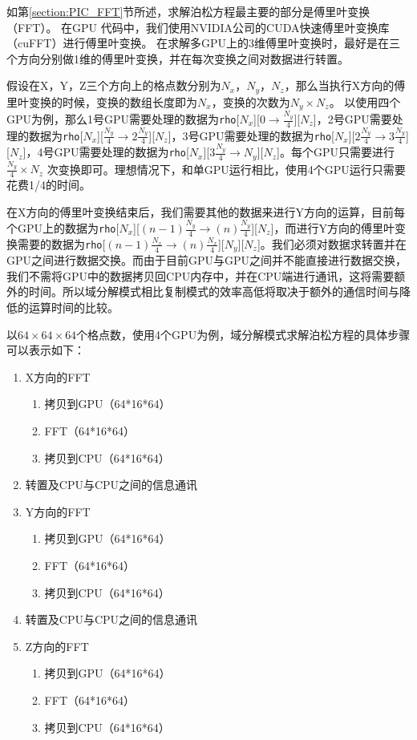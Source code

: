 如第\ref{section:PIC_FFT}节所述，求解泊松方程最主要的部分是傅里叶变换（FFT）。
在GPU 代码中，我们使用NVIDIA公司的CUDA快速傅里叶变换库（cuFFT）\cite{nvidia2010cufft}进行傅里叶变换。
在求解多GPU上的3维傅里叶变换时，最好是在三个方向分别做1维的傅里叶变换，并在每次变换之间对数据进行转置。

假设在X，Y，Z三个方向上的格点数分别为$N_x$，$N_y$，$N_z$，那么当执行X方向的傅里叶变换的时候，变换的数组长度即为$N_x$，变换的次数为$N_y \times N_z$。 以使用四个GPU为例，那么1号GPU需要处理的数据为\verb'rho'[$N_x$][$0 \rightarrow \frac{N_y}{4}$][$N_z$]，2号GPU需要处理的数据为\verb'rho'[$N_x$][$\frac{N_y}{4} \rightarrow 2\frac{N_y}{4}$][$N_z$]，3号GPU需要处理的数据为\verb'rho'[$N_x$][$2\frac{N_y}{4}\rightarrow 3\frac{N_y}{4}$][$N_z$]，4号GPU需要处理的数据为\verb'rho'[$N_x$][$3\frac{N_y}{4}\rightarrow N_y$][$N_z$]。每个GPU只需要进行$\frac{N_y}{4} \times N_z$ 次变换即可。理想情况下，和单GPU运行相比，使用4个GPU运行只需要花费1/4的时间。

在X方向的傅里叶变换结束后，我们需要其他的数据来进行Y方向的运算，目前每个GPU上的数据为\verb'rho'[$N_x$][$(n-1)\frac{N_y}{4}\rightarrow (n)\frac{N_y}{4}$][$N_z$]，而进行Y方向的傅里叶变换需要的数据为\verb'rho'[$(n-1)\frac{N_x}{4}\rightarrow (n)\frac{N_x}{4}$][$N_y$][$N_z$]。我们必须对数据求转置并在GPU之间进行数据交换。而由于目前GPU与GPU之间并不能直接进行数据交换，我们不需将GPU中的数据拷贝回CPU内存中，并在CPU端进行通讯，这将需要额外的时间。所以域分解模式相比复制模式的效率高低将取决于额外的通信时间与降低的运算时间的比较。

以$64 \times 64 \times 64$个格点数，使用4个GPU为例，域分解模式求解泊松方程的具体步骤可以表示如下：
\begin{enumerate}
  \item X方向的FFT
  \begin{enumerate}
    \item 拷贝到GPU（64*16*64）
    \item FFT（64*16*64）
    \item 拷贝到CPU（64*16*64）
  \end{enumerate}
  \item 转置及CPU与CPU之间的信息通讯
  \item Y方向的FFT
  \begin{enumerate}
    \item 拷贝到GPU（64*16*64）
    \item FFT（64*16*64）
    \item 拷贝到CPU（64*16*64）
  \end{enumerate}
  \item 转置及CPU与CPU之间的信息通讯
  \item Z方向的FFT
  \begin{enumerate}
    \item 拷贝到GPU（64*16*64）
    \item FFT（64*16*64）
    \item 拷贝到CPU（64*16*64）
  \end{enumerate}
\end{enumerate}

